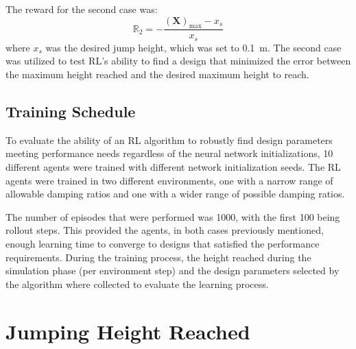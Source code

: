 \documentclass[10pt,twocolumn,letterpaper]{article}
\begin{document}
The reward for the second case was:
%
\begin{equation}
        \mathbb{R}_2 = - \frac{\left (\textbf{X}  \right )_{\text{max}} - x_{s}}{x_{s}}
\end{equation}
%
where $x_s$ was the desired jump height, which was set to 0.1~m. The second case was utilized to test RL's ability to find a design that minimized the error between the maximum height reached and the desired maximum height to reach. 

\subsection{Training Schedule}

To evaluate the ability of an RL algorithm to robustly find design parameters meeting performance needs regardless of the neural network initializations, 10 different agents were trained with different network initialization seeds. The RL agents were trained in two different environments, one with a narrow range of allowable damping ratios and one with a wider range of possible damping ratios.

The number of episodes that were performed was 1000, with the first 100 being rollout steps. This provided the agents, in both cases previously mentioned, enough learning time to converge to designs that satisfied the performance requirements. During the training process, the height reached during the simulation phase (per environment step) and the design parameters selected by the algorithm where collected to evaluate the learning process. 

\section{Jumping Height Reached} 
\label{sec:results}
\end{document}
